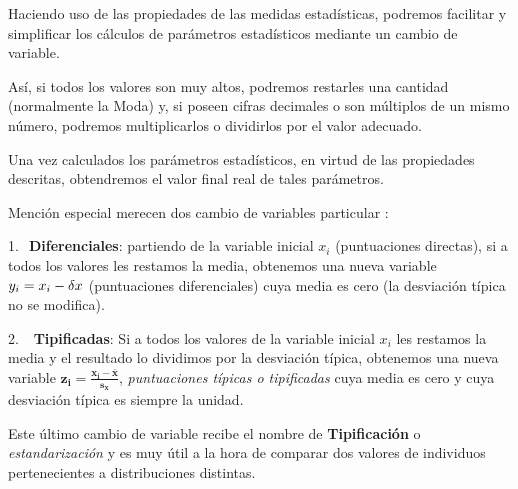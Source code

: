 \begin{definition}
	
Haciendo uso de las propiedades de las medidas estadísticas, podremos facilitar y simplificar los cálculos de parámetros estadísticos mediante un cambio de variable.

\vspace{2mm} Así, si todos los valores son muy altos, podremos restarles una cantidad (normalmente la Moda) y, si poseen cifras decimales o son múltiplos de un mismo número, podremos multiplicarlos o dividirlos por el valor adecuado. 

\vspace{2mm} Una vez calculados los parámetros estadísticos, en virtud de las propiedades descritas, obtendremos el valor final real de tales parámetros. 

\vspace{2mm} Mención especial merecen dos cambio de variables particular : 

1.$\ $ \textbf{Diferenciales}: partiendo de la variable inicial $x_i$ (puntuaciones directas), si a todos los valores les restamos la media, obtenemos una nueva variable $y_i=x_i-\var x$ (puntuaciones diferenciales) cuya media es cero (la desviación típica no se modifica). 

2.$\ $  \textbf{Tipificadas}: Si a todos los valores de la variable inicial $x_i$ les restamos la media y el resultado lo dividimos por la desviación típica, obtenemos una nueva variable $\boldsymbol{z_i=\frac{x_i-\bar x}{s_x}}$, \emph{puntuaciones típicas o tipificadas} cuya media es cero y cuya  desviación típica es siempre la unidad. 

\vspace{2mm} Este último cambio de variable recibe el nombre de \textbf{Tipificación} o \emph{estandarización} y es muy útil a la hora de comparar dos valores de individuos pertenecientes a distribuciones distintas.
\end{definition}


